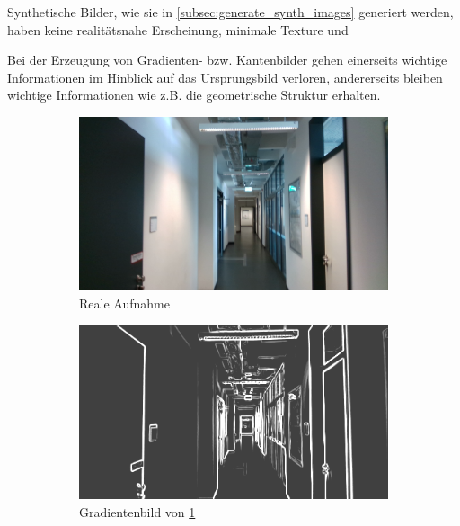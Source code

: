 Synthetische Bilder, wie sie in  \ref{subsec:generate_synth_images} generiert werden, haben keine realitätsnahe Erscheinung, minimale Texture und 


Bei der Erzeugung von Gradienten- bzw. Kantenbilder gehen einerseits wichtige Informationen im Hinblick auf das Ursprungsbild verloren, andererseits bleiben wichtige Informationen wie z.B. die geometrische Struktur erhalten.


\vspace{\fill}
\begin{figure}[htp]
	\centering
	\begin{subfigure}[b]{0.48\linewidth}
		\centering
		\includegraphics[width=\linewidth]{images/example/r000305.png}
		\caption{Reale Aufnahme}
		\label{subfig:real}
	\end{subfigure}
	\hfill
	\begin{subfigure}[b]{0.48\linewidth}
		\centering
		\includegraphics[width=\linewidth]{images/example/rg000305.png}
		\caption{Gradientenbild von \ref{subfig:real}}
	\end{subfigure}
	\hfill
	\begin{subfigure}[b]{0.48\linewidth}

\end{subfigure}
\end{figure}

